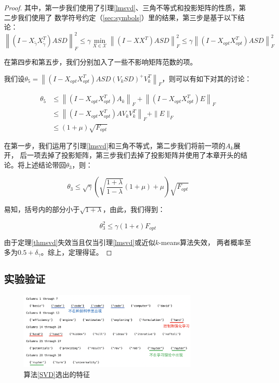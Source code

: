 \documentclass{ctexart}
\begin{document}
\begin{proof}
        其中，第一步我们使用了引理\autoref{lmsvd}、三角不等式和投影矩阵的性质，第二步我们使用了
        数学符号约定（\autoref{sec:symbols}）里的结果，第三步是基于以下结论：
        $$
        \left\|\left(I-X_{\tilde{\gamma}} X_{\tilde{\gamma}}^{T}\right) A S D\right\|_{F}^{2} \leq \gamma \min _{X \in \mathcal{X}}\left\|\left(I-X X^{T}\right) A S D\right\|_{F}^{2} \leq \gamma\left\|\left(I-X_{o p t} X_{o p t}^{T}\right) A S D\right\|_{F}^{2}
        $$

        在第四步和第五步，我们分别加入了一些不影响矩阵范数的项。

        我们设$\theta_5 = \left\|\left(I-X_{o p t} X_{o p t}^{T}\right) A S D\left(V_{k} S D\right)^{+} V_{k}^{T}\right\|_{F}$，则可以有如下对其的讨论：

        $$
        \begin{aligned} \theta_{5} & \leq\left\|\left(I-X_{o p t} X_{o p t}^{T}\right) A_{k}\right\|_{F}+\left\|\left(I-X_{o p t} X_{o p t}^{T}\right) E\right\|_{F} \\ & \leq\left\|\left(I-X_{o p t} X_{o p t}^{T}\right) A V_{k} V_{k}^{T}\right\|_{F}+\|E\|_{F} \\ & \leq(1+\mu) \sqrt{F_{o p t}} \end{aligned}
        $$

        在第一步，我们运用了引理\autoref{lmsvd}和三角不等式，第二步我们将前一项的$A_k$展开，
        后一项去掉了投影矩阵，第三步我们去掉了投影矩阵并使用了本章开头的结论。将上述结论带回$\theta_3$，则：

        $$
        \theta_{3} \leq \sqrt{\gamma}(\sqrt{\frac{1+\lambda}{1-\lambda}}(1+\mu)+\mu) \sqrt{F_{o p t}}
        $$

        易知，括号内的部分小于$\sqrt{1 + \lambda}$，由此，我们得到：

        $$
        \theta_{3}^{2} \leq \gamma(1+\epsilon) F_{o p t}
        $$

        由于定理\autoref{thmsvd}失效当且仅当引理\autoref{lmsvd}或近似$k$-means算法失效，
        两者概率至多为$0.5+\delta_\gamma$。综上，定理得证。
    \end{proof}
    \subsection{实验验证}
    \label{sec:svdexp}

    \begin{figure}
        \centering
        \includegraphics[width=0.8\textwidth]{result/words.png}
        \caption{算法\autoref{SVD}选出的特征}
        \label{fig:svdfeat}
    \end{figure}
\end{document}
